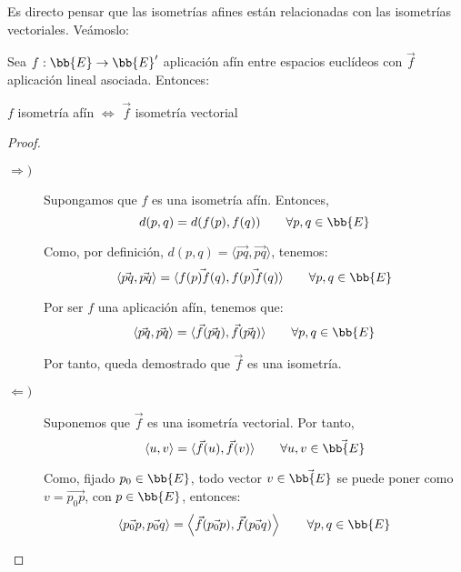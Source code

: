 Es directo pensar que las isometrías afines están relacionadas con las isometrías vectoriales. Veámoslo:
\begin{teo}
    Sea $f:\bb{E}\to \bb{E}'$ aplicación afín entre espacios euclídeos con $\vec{f}$ aplicación lineal asociada. Entonces:
    \begin{center}
        $f$ isometría afín $\Longleftrightarrow$ $\vec{f}$ isometría vectorial 
    \end{center}
\end{teo}
\begin{proof}\
    \begin{description}
        \item[$\Longrightarrow)$] Supongamos que $f$ es una isometría afín. Entonces, 
        $$d(p,q)=d(f(p),f(q))\qquad \forall p,q\in \bb{E}$$

        Como, por definición, $d(p,q)=\langle \vec{pq},\vec{pq}\rangle$, tenemos:
        \begin{equation*}
            \langle \vec{pq}, \vec{pq}\rangle
            = \langle \vec{f(p)f(q)}, \vec{f(p)f(q)}\rangle \qquad \forall p,q\in \bb{E}
        \end{equation*}

        Por ser $f$ una aplicación afín, tenemos que:
        \begin{equation*}
            \langle \vec{pq}, \vec{pq}\rangle
            = \langle \vec{f}(\vec{pq}), \vec{f}(\vec{pq})\rangle  \qquad \forall p,q\in \bb{E}
        \end{equation*}

        Por tanto, queda demostrado que $\vec{f}$ es una isometría.

        \item[$\Longleftarrow)$] Suponemos que $\vec{f}$ es una isometría vectorial. Por tanto,
        \begin{equation*}
            \langle u,v\rangle = \langle \vec{f}(u),\vec{f}(v)\rangle \qquad \forall u,v\in \vec{\bb{E}}
        \end{equation*}

        Como, fijado $p_0\in \bb{E}$, todo vector $v\in \vec{\bb{E}}$ se puede poner como $v=\vec{p_0p}$, con $p\in \bb{E}$, entonces:
        \begin{equation*}
            \langle \vec{p_0p},\vec{p_0q}\rangle = \left\langle \vec{f}(\vec{p_0p}),\vec{f}(\vec{p_0q})\right\rangle \qquad \forall p,q\in {\bb{E}}
        \end{equation*}


\end{description}
\end{proof}
